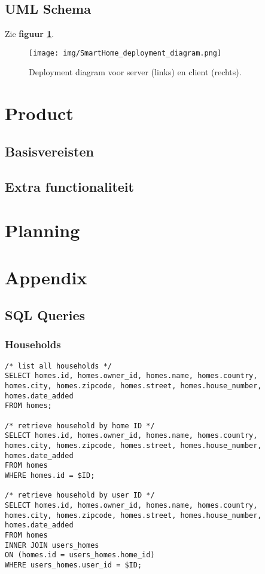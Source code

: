 \documentclass[11pt]{article}
\begin{document}
  \subsection{UML Schema}
  Zie \textbf{figuur \ref{fig:uml}}.
  \begin{figure}[H]
  \centering
    \texttt{[image: img/SmartHome\_deployment\_diagram.png]}
  \caption{Deployment diagram voor server (links) en client (rechts).}
  \label{fig:uml}
  \end{figure}
\section{Product}
  \subsection{Basisvereisten}
  \subsection{Extra functionaliteit}
\section{Planning}
\section{Appendix}
  \subsection{SQL Queries}
  \subsubsection{Households}
\begin{lstlisting}[style=SQL]
/* list all households */
SELECT homes.id, homes.owner_id, homes.name, homes.country, homes.city, homes.zipcode, homes.street, homes.house_number, homes.date_added
FROM homes;

/* retrieve household by home ID */
SELECT homes.id, homes.owner_id, homes.name, homes.country, homes.city, homes.zipcode, homes.street, homes.house_number, homes.date_added
FROM homes
WHERE homes.id = $ID;

/* retrieve household by user ID */
SELECT homes.id, homes.owner_id, homes.name, homes.country, homes.city, homes.zipcode, homes.street, homes.house_number, homes.date_added
FROM homes
INNER JOIN users_homes
ON (homes.id = users_homes.home_id)
WHERE users_homes.user_id = $ID;
\end{lstlisting}
\end{document}
